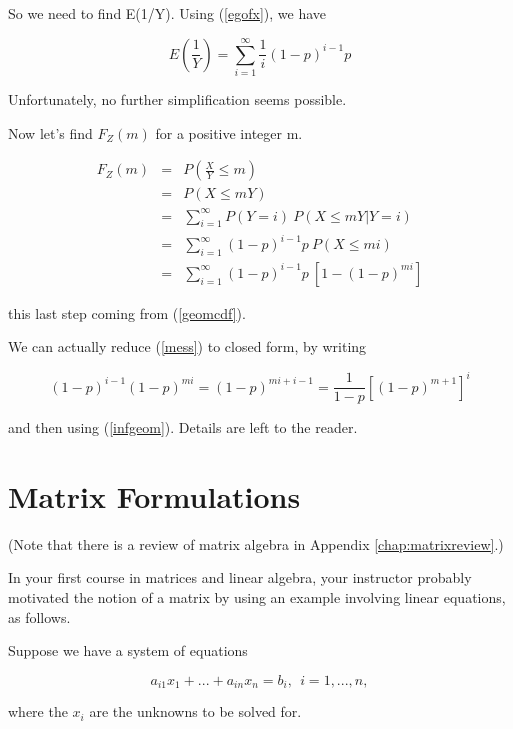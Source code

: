 So we need to find E(1/Y).  Using (\ref{egofx}), we have

\begin{equation}
E(\frac{1}{Y}) = \sum_{i=1}^{\infty} \frac{1}{i} (1-p)^{i-1} p
\end{equation}



Unfortunately, no further simplification seems possible.

Now let's find $F_Z(m)$ for a positive integer m.

\begin{eqnarray}
F_Z(m) &=& P \left (\frac{X}{Y} \leq m \right ) \\ 
&=& P(X \leq mY) \\ 
&=& \sum_{i=1}^{\infty} P(Y = i) ~ P(X \leq mY | Y = i) \\
&=& \sum_{i=1}^{\infty} (1-p)^{i-1} p ~ P(X \leq mi) \\
&=& \sum_{i=1}^{\infty} (1-p)^{i-1} p ~ [1 - (1-p)^{mi}]
\label{mess}
\end{eqnarray}

this last step coming from (\ref{geomcdf}).

We can actually reduce (\ref{mess}) to closed form, by writing

\begin{equation}
(1-p)^{i-1} (1-p)^{mi} =  (1-p)^{mi+i-1} = \frac{1}{1-p}
\left [ (1-p)^{m+1} \right ]^i
\end{equation}

and then using (\ref{infgeom}).  Details are left to the reader.

\section{Matrix Formulations}
\label{matrix}

(Note that there is a review of matrix algebra in Appendix
\ref{chap:matrixreview}.)

In your first course in matrices and linear algebra, your instructor
probably motivated the notion of a matrix by using an example involving
linear equations, as follows.

Suppose we have a system of equations

\begin{equation}
\label{linsyst}
a_{i1} x_1 + ... + a_{in} x_{n} = b_i, ~~ i = 1,...,n,
\end{equation}

where the $x_i$ are the unknowns to be solved for.

